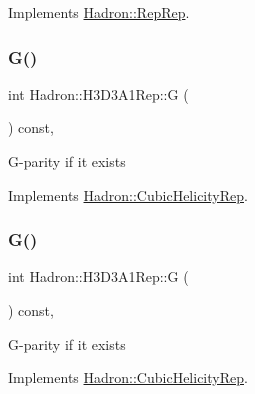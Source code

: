 Implements \mbox{\hyperlink{structHadron_1_1RepRep_a92c8802e5ed7afd7da43ccfd5b7cd92b}{Hadron\+::\+Rep\+Rep}}.

\mbox{\label{structHadron_1_1H3D3A1Rep_acc86f1e291571190123adf57dc635290}} 
\subsubsection{\texorpdfstring{G()}{G()}\hspace{0.1cm}{\footnotesize\ttfamily [1/3]}}
{\footnotesize\ttfamily int Hadron\+::\+H3\+D3\+A1\+Rep\+::G (\begin{DoxyParamCaption}{ }\end{DoxyParamCaption}) const\hspace{0.3cm}{\ttfamily [inline]}, {\ttfamily [virtual]}}

G-\/parity if it exists 

Implements \mbox{\hyperlink{structHadron_1_1CubicHelicityRep_a50689f42be1e6170aa8cf6ad0597018b}{Hadron\+::\+Cubic\+Helicity\+Rep}}.

\mbox{\label{structHadron_1_1H3D3A1Rep_acc86f1e291571190123adf57dc635290}} 
\subsubsection{\texorpdfstring{G()}{G()}\hspace{0.1cm}{\footnotesize\ttfamily [2/3]}}
{\footnotesize\ttfamily int Hadron\+::\+H3\+D3\+A1\+Rep\+::G (\begin{DoxyParamCaption}{ }\end{DoxyParamCaption}) const\hspace{0.3cm}{\ttfamily [inline]}, {\ttfamily [virtual]}}

G-\/parity if it exists 

Implements \mbox{\hyperlink{structHadron_1_1CubicHelicityRep_a50689f42be1e6170aa8cf6ad0597018b}{Hadron\+::\+Cubic\+Helicity\+Rep}}.

\mbox{\label{structHadron_1_1H3D3A1Rep_acc86f1e291571190123adf57dc635290}} 
